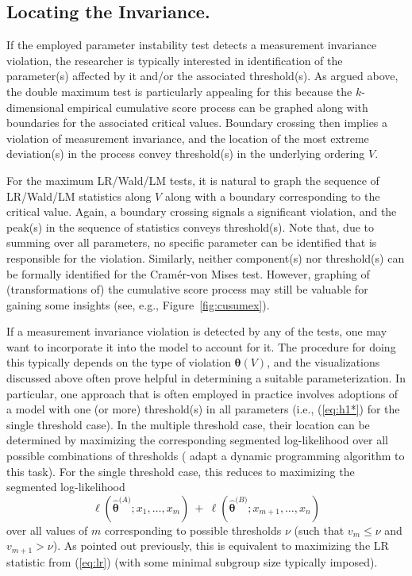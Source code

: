 \documentclass[man]{apa}
\begin{document}
\subsection{Locating the Invariance.}

If the employed parameter instability test detects a measurement invariance violation,
the researcher is typically interested in identification of the parameter(s) affected
by it and/or the associated threshold(s). As argued above, the double maximum test
is particularly appealing for this because the $k$-dimensional empirical cumulative
score process can be graphed along with boundaries for the associated critical values.
Boundary crossing then implies a violation of measurement invariance, and the location of
the most extreme deviation(s) in the process convey threshold(s) in the underlying
ordering $V$.

For the maximum LR/Wald/LM tests, it is natural to graph the sequence of LR/Wald/LM
statistics along $V$ along with a boundary corresponding to the critical value.
Again, a boundary crossing signals a significant violation, and the peak(s) in the
sequence of statistics conveys threshold(s). Note that, due to summing over all
parameters, no specific parameter can be identified that is responsible for the
violation. Similarly,  neither component(s) nor threshold(s)
can be formally identified for the Cram\'{e}r-von Mises test. However, graphing of (transformations of) the cumulative
score process may still be valuable for gaining some insights (see,
e.g., Figure~\ref{fig:cusumex}).

If a measurement invariance violation is detected by any of the tests,
one may want to incorporate it into the model to account for it. The
procedure for doing this  typically depends on the type of violation ${\bm \theta}(V)$, and the visualizations
discussed above often prove helpful in determining a suitable parameterization.
In particular, one approach that is often employed in practice
involves adoptions of a model
with one (or more) threshold(s) in all parameters (i.e., (\ref{eq:h1*}) for the
single threshold case). In the multiple threshold case, their location can
be determined by maximizing the corresponding segmented log-likelihood over all
possible combinations of thresholds ( adapt a dynamic programming
algorithm to this task). For the single threshold case, this reduces to
maximizing the segmented log-likelihood
\begin{equation} \label{eq:seglik}
  \ell(\hat {\bm \theta}^{({A)}}; x_1, \dots, x_m) ~+~ \ell(\hat {\bm \theta}^{({B)}}; x_{m+1}, \dots, x_n)
\end{equation}
over all values of $m$ corresponding to possible thresholds $\nu$ (such that $v_m \le \nu$ and
$v_{m+1} > \nu$). As pointed out previously, this is equivalent to maximizing the LR statistic
from (\ref{eq:lr}) (with some minimal subgroup size typically imposed).
\end{document}
